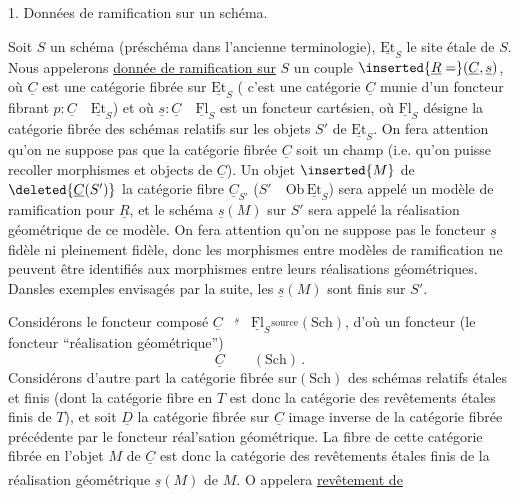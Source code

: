 1. Données de ramification sur un schéma.

Soit $S$ un schéma (préschéma dans l'ancienne terminologie), $\underline{\mathrm{Et}}_S$ le site étale de $S$. Nous appelerons \uline{donnée de ramification sur} $S$  un couple $\inserted{\underline{R}=}(\underline{C},\underline{s})$, où $\underline{C}$ est une catégorie fibrée sur $\underline{\mathrm{Et}}_S$ ( c'est une catégorie $\underline{C}$ munie d'un foncteur fibrant $p:\underline{C}\quad\underline{\mathrm{Et}}_S$) et où $\underline{s}:\underline{C}\quad\underline{\mathrm{Fl}}_S$ est un foncteur cartésien, où $\underline{\mathrm{Fl}}_S$ désigne la catégorie fibrée des  schémas relatifs sur les objets $S'$ de $\underline{\mathrm{Et}}_S$. On fera attention qu'on ne suppose pas que la catégorie fibrée $\underline{C}$ soit un champ (i.e. qu'on puisse recoller morphismes et objects de $\underline{C}$). Un objet $\inserted{M}$ de $\deleted{\underline{C}(S')}$ la catégorie fibre $\underline{C}_{S'}$ ($S'\quad\mathrm{Ob}\,\underline{\mathrm{Et}}_S$) sera appelé un modèle de ramification pour $\underline{R}$, et le schéma $\underline{s}(M)$ sur $S'$ sera appelé la réalisation géométrique de ce modèle. On fera attention qu'on ne suppose pas le foncteur $\underline{s}$ fidèle ni pleinement fidèle, donc les morphismes entre modèles de ramification ne peuvent être identifiés aux morphismes entre leurs réalisations géométriques. Dansles exemples envisagés par la suite, les $\underline{s}(M)$ sont finis sur $S'$.

Considérons le foncteur composé $\underline{C}\overset{\underline{s}}{\qquad}\underline{\mathrm{Fl}}_S\overset{\mathrm{source}}{\qquad}(\mathrm{Sch})$, d'où un foncteur (le foncteur ``réalisation géométrique'')
\[
\underline{C}\qquad(\mathrm{Sch})\,.
\]
Considérons d'autre part la catégorie fibrée sur$(\mathrm{Sch})$ des schémas relatifs étales et finis (dont la catégorie fibre en $T$ est donc la catégorie des revêtements étales finis de $T$), et soit $\underline{D}$ la catégorie fibrée sur $\underline{C}$ image inverse de la catégorie fibrée précédente par le foncteur réal'sation géométrique. La fibre de cette catégorie fibrée en l'objet $M$ de $\underline{C}$ est donc la catégorie des revêtements étales finis de la réalisation géométrique $\underline{s}(M)$ de $M$. O\textsuperscript{} appelera \uline{revêtement de} 
